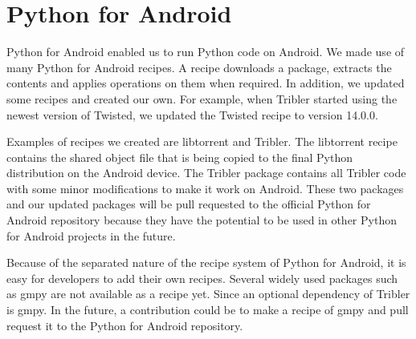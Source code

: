 \section{Python for Android}
\label{sec:pythonforandroid}
	Python for Android enabled us to run Python code on Android. We made use of many Python for Android recipes. A recipe downloads a package, extracts the contents and applies operations on them when required. In addition, we updated some recipes and created our own. For example, when Tribler started using the newest version of Twisted, we updated the Twisted recipe to version 14.0.0.
	
	Examples of recipes we created are libtorrent and Tribler. The libtorrent recipe contains the shared object file that is being copied to the final Python distribution on the Android device. The Tribler package contains all Tribler code with some minor modifications to make it work on Android. These two packages and our updated packages will be pull requested to the official Python for Android repository because they have the potential to be used in other Python for Android projects in the future.
	
	Because of the separated nature of the recipe system of Python for Android, it is easy for developers to add their own recipes. Several widely used packages such as gmpy are not available as a recipe yet. Since an optional dependency of Tribler is gmpy. In the future, a contribution could be to make a recipe of gmpy and pull request it to the Python for Android repository.